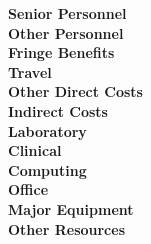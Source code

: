 
\noindent \textbf{Senior Personnel}\\

\noindent \textbf{Other Personnel}\\


\noindent \textbf{Fringe Benefits}\\

\noindent \textbf{Travel}\\

\noindent \textbf{Other Direct Costs}\\


\noindent \textbf{Indirect Costs}\\

\newpage
{}
\noindent \textbf{Laboratory}\\


\noindent \textbf{Clinical}\\

\noindent \textbf{Computing}\\


\noindent \textbf{Office}\\

\noindent \textbf{Major Equipment}\\

\noindent \textbf{Other Resources}\\

\noindent 





